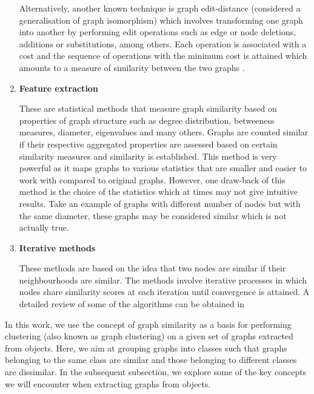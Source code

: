 \documentclass[10pt,a4paper]{article}
\theoremstyle{plain}
\theoremstyle{definition}
\begin{document}
\begin{enumerate}
     Alternatively, another known technique is graph edit-distance (considered a generalisation of graph isomorphism) which involves transforming one graph into another by performing edit operations such as edge or node deletions, additions or substitutions, among others. Each operation is associated with a cost and the sequence of operations with the minimum cost is attained which amounts to a measure of similarity between the two graphs \citep{gao2010survey}.
     
     \item \textbf{Feature extraction}
     
     These are statistical methods that measure graph similarity based on properties of graph structure such as degree distribution, betweeness measures, diameter, eigenvalues and many others. Graphs are counted similar if their respective aggregated properties are assessed based on certain similarity measures and similarity is established. This method is very powerful as it maps graphs to various statistics that are smaller and easier to work with compared to original graphs. However, one draw-back of this method is the choice of the statistics which at times may not give intuitive results. Take an example of graphs with different number of nodes but with the same diameter, these graphs may be considered similar which is not actually true.
     
     \item \textbf{Iterative methods}
     
     These methods are based on the idea that two nodes are similar if their neighbourhoods are similar. The methods involve iterative processes in which nodes share similarity scores at each iteration until convergence is attained. A detailed review of some of the algorithms can be obtained in  \citep{jeh2002simrank,melnik2002similarity,zager2008graph}
     \end{enumerate}
     In this work, we use the concept of graph similarity as a basis for performing clustering (also known as graph clustering) on a given set of graphs extracted from objects. Here, we aim at grouping graphs into classes such that graphs belonging to the same class are similar and those belonging to different classes are dissimilar. In the subsequent subsection, we explore some of the key concepts we will encounter when extracting graphs from objects.
 
\end{document}
